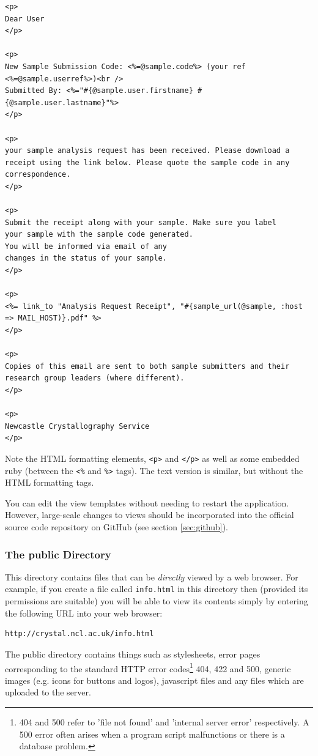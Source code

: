\documentclass[12pt,twoside]{article}
\begin{document}
\begin{description}
\tiny
\begin{verbatim}
<p>
Dear User
</p>

<p>
New Sample Submission Code: <%=@sample.code%> (your ref <%=@sample.userref%>)<br />
Submitted By: <%="#{@sample.user.firstname} #{@sample.user.lastname}"%>
</p>

<p>
your sample analysis request has been received. Please download a
receipt using the link below. Please quote the sample code in any
correspondence.
</p>

<p>
Submit the receipt along with your sample. Make sure you label
your sample with the sample code generated.
You will be informed via email of any
changes in the status of your sample.
</p>

<p>
<%= link_to "Analysis Request Receipt", "#{sample_url(@sample, :host => MAIL_HOST)}.pdf" %>
</p>

<p>
Copies of this email are sent to both sample submitters and their
research group leaders (where different).
</p>

<p>
Newcastle Crystallography Service
</p>
\end{verbatim}
\normalsize

Note the HTML formatting elements, \verb=<p>= and \verb=</p>= as well
as some embedded ruby (between the \verb=<%= and \verb=%>= tags).
The text version is similar, but without the HTML formatting tags.

\begin{plainblock}
You can edit the view templates without needing to restart
the application. However, large-scale changes to views should be
incorporated into the official source code repository on GitHub
(see section \ref{sec:github}).
\end{plainblock}

\end{description}
\subsubsection{The public Directory}
This directory contains files that can be \emph{directly} viewed by
a web browser. For example, if you create a file called \verb=info.html=
in this directory then (provided its permissions are suitable) you will be
able to view its contents simply by entering the following URL into your
web browser:
\begin{verbatim}
http://crystal.ncl.ac.uk/info.html
\end{verbatim}
The public directory contains things such as stylesheets, error pages
corresponding to the standard HTTP error codes\footnote{404 and 500 refer
to 'file not found' and 'internal server error' respectively. A 500 error
often arises when a program script malfunctions or there is a 
database problem.} 404, 422 and 500, generic
images (e.g. icons for buttons and logos), javascript files and any files
which are uploaded to the server. 
\end{document}
